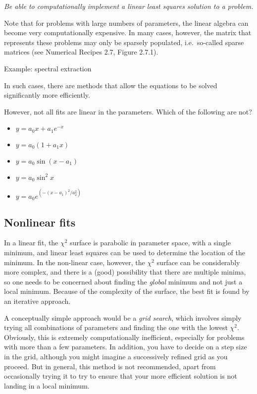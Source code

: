 \documentclass{article}
\newcommand{\test}[1]{%
    \begin{center}
        \colorbox{hl}{\parbox{0.9\textwidth}{\emph{\centering #1}}}
    \end{center}}
\begin{document}
\test{Be able to computationally implement a linear least squares solution
to a problem.}

Note that for problems with large numbers of parameters, the linear algebra
can become very computationally expensive. In many cases, however, the
matrix that represents these problems may only be sparsely populated,
i.e.\ so-called sparse matrices (see Numerical Recipes 2.7, Figure 2.7.1).

Example: spectral extraction

In such cases, there are methods that allow the equations to be solved
significantly more efficiently.

However, not all fits are linear in the parameters. Which of the
following are not?
\begin{itemize}
    \item $y = a_{0}x + a_{1}e^{-x}$
    \item $y = a_{0}(1 + a_{1}x)$
    \item $y = a_{0}\sin(x - a_{1})$
    \item $y = a_{0}\sin^{2}x$
    \item $y = a_{0}e^{ \left( -\left(x - a_{1} \right) ^{2}/a_{2}^{2} \right)}$
\end{itemize}

\subsection{Nonlinear fits}
In a linear fit, the $\chi^{2}$ surface is parabolic in parameter
space, with a single minimum, and linear least squares can be used to
determine the location of the minimum. In the non-linear case, however, the
$\chi^{2}$ surface can be considerably more complex, and there is a
(good) possibility that there are multiple minima, so one needs to be
concerned about finding the \emph{global} minimum and not just a local minimum.
Because of the complexity of the surface, the best fit is found by an
iterative approach.

A conceptually simple approach would be a \textit{grid search}, which involves
simply trying all combinations of parameters and finding the one with the lowest
$\chi^{2}$. Obviously, this is extremely computationally inefficient,
especially for problems with more than a few parameters.
In addition, you have to
decide on a step size in the grid, although you might imagine a
successively refined grid as you proceed. But in general, this method is
not recommended, apart from occasionally trying it to try to ensure that
your more efficient solution is not landing in a local minimum.
\end{document}
